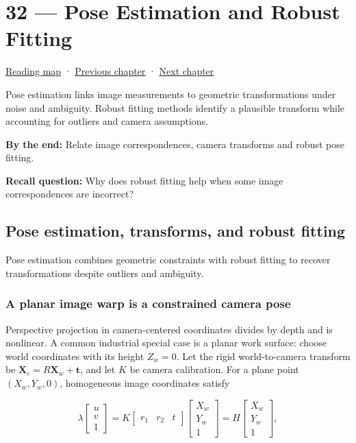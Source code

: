 \hypertarget{04-visual-computing-ii-ch032}{}
\chapter{32 --- Pose Estimation and Robust Fitting}\label{04-visual-computing-ii-ch032-pose-estimation-and-robust-fitting}

\hyperref[volume-reading-map]{Reading map} · \hyperref[04-visual-computing-ii-ch031-learning-a-visual-classifier]{Previous chapter} · \hyperref[04-visual-computing-ii-ch033-projection-scale-and-incidence-geometry]{Next chapter}

Pose estimation links image measurements to geometric transformations under noise and ambiguity. Robust fitting methods identify a plausible transform while accounting for outliers and camera assumptions.

\textbf{By the end:} Relate image correspondences, camera transforms and robust pose fitting.

\textbf{Recall question:} Why does robust fitting help when some image correspondences are incorrect?

\section{Pose estimation, transforms, and robust fitting}\label{04-visual-computing-ii-ch032-pose-estimation-transforms-and-robust-fitting}

Pose estimation combines geometric constraints with robust fitting to recover transformations despite outliers and ambiguity.

\subsection{A planar image warp is a constrained camera pose}\label{04-visual-computing-ii-ch032-a-planar-image-warp-is-a-constrained-camera-pose}

Perspective projection in camera-centered coordinates divides by depth and is nonlinear. A common industrial special case is a planar work surface: choose world coordinates with its height \(Z_w=0\). Let the rigid world-to-camera transform be \(\mathbf{X}_c=R\mathbf{X}_w+\mathbf{t}\), and let \(K\) be camera calibration. For a plane point \((X_w,Y_w,0)\), homogeneous image coordinates satisfy

\[
\lambda\begin{bmatrix}u\\v\\1\end{bmatrix}=K\begin{bmatrix}r_1&r_2&t\end{bmatrix}\begin{bmatrix}X_w\\Y_w\\1\end{bmatrix}=H\begin{bmatrix}X_w\\Y_w\\1\end{bmatrix},
\]

